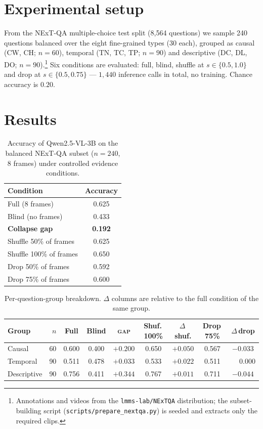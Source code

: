 \documentclass[11pt]{article}
\newcommand{\gap}{\textsc{gap}}
\begin{document}
\section{Experimental setup}

From the NExT-QA multiple-choice test split (8{,}564 questions) we sample 240
questions balanced over the eight fine-grained types (30 each), grouped as
causal (CW, CH; $n{=}60$), temporal (TN, TC, TP; $n{=}90$) and descriptive (DC,
DL, DO; $n{=}90$).\footnote{Annotations and videos from the
\texttt{lmms-lab/NExTQA} distribution; the subset-building script
(\texttt{scripts/prepare\_nextqa.py}) is seeded and extracts only the required
clips.} Six conditions are evaluated: full, blind, shuffle at
$s\in\{0.5, 1.0\}$ and drop at $s\in\{0.5, 0.75\}$ --- $1{,}440$ inference
calls in total, no training. Chance accuracy is $0.20$.

\section{Results}

\begin{table}[t]
\centering
\caption{Accuracy of Qwen2.5-VL-3B on the balanced NExT-QA subset
($n{=}240$, 8 frames) under controlled evidence conditions.}
\label{tab:overall}
\begin{tabular}{lc}
\toprule
Condition & Accuracy \\
\midrule
Full (8 frames)            & 0.625 \\
Blind (no frames)          & 0.433 \\
\textbf{Collapse gap}      & \textbf{0.192} \\
\midrule
Shuffle 50\% of frames     & 0.625 \\
Shuffle 100\% of frames    & 0.650 \\
Drop 50\% of frames        & 0.592 \\
Drop 75\% of frames        & 0.600 \\
\bottomrule
\end{tabular}
\end{table}

\begin{table}[t]
\centering
\caption{Per-question-group breakdown. $\Delta$ columns are relative to the
full condition of the same group.}
\label{tab:groups}
\setlength{\tabcolsep}{5pt}
\begin{tabular}{lrccccccc}
\toprule
Group & $n$ & Full & Blind & \gap{} & Shuf.\,100\% & $\Delta$\,shuf. & Drop\,75\% & $\Delta$\,drop \\
\midrule
Causal      & 60 & 0.600 & 0.400 & $+0.200$ & 0.650 & $+0.050$ & 0.567 & $-0.033$ \\
Temporal    & 90 & 0.511 & 0.478 & $\mathbf{+0.033}$ & 0.533 & $+0.022$ & 0.511 & $\phantom{-}0.000$ \\
Descriptive & 90 & 0.756 & 0.411 & $+0.344$ & 0.767 & $+0.011$ & 0.711 & $-0.044$ \\
\bottomrule
\end{tabular}
\end{table}
\end{document}
